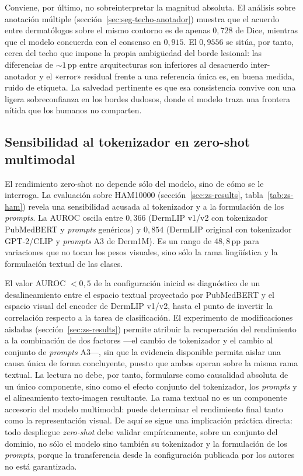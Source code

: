 Conviene, por último, no sobreinterpretar la magnitud absoluta. El
análisis sobre anotación múltiple
(sección~\ref{sec:seg-techo-anotador}) muestra que el acuerdo entre
dermatólogos sobre el mismo contorno es de apenas $0{,}728$ de Dice,
mientras que el modelo concuerda con el consenso en $0{,}915$. El
$0{,}9556$ se sitúa, por tanto, cerca del techo que impone la propia
ambigüedad del borde lesional: las diferencias de $\sim 1$\,pp entre
arquitecturas son inferiores al desacuerdo inter-anotador y el «error»
residual frente a una referencia única es, en buena medida, ruido de
etiqueta. La salvedad pertinente es que esa consistencia convive con
una ligera sobreconfianza en los bordes dudosos, donde el modelo traza
una frontera nítida que los humanos no comparten.

\subsection{Sensibilidad al tokenizador en zero-shot multimodal}
\label{sec:disc-zs}

El rendimiento zero-shot no depende sólo del modelo, sino de cómo se
le interroga. La evaluación sobre HAM10000
(sección~\ref{sec:zs-results}, tabla~\ref{tab:zs-ham}) revela una
sensibilidad acusada al tokenizador y a la formulación de los
\emph{prompts}. La AUROC oscila entre $0{,}366$ (DermLIP v1/v2 con
tokenizador PubMedBERT y \emph{prompts} genéricos) y $0{,}854$
(DermLIP original con tokenizador GPT-2/CLIP y \emph{prompts} A3 de
Derm1M). Es un rango de $48{,}8$\,pp para variaciones que no tocan
los pesos visuales, sino sólo la rama lingüística y la formulación
textual de las clases.

El valor AUROC $<0{,}5$ de la configuración inicial es diagnóstico de un
desalineamiento entre el espacio textual proyectado por PubMedBERT y el
espacio visual del encoder de DermLIP v1/v2, hasta el punto de invertir la
correlación respecto a la tarea de clasificación. El experimento de
modificaciones aisladas (sección~\ref{sec:zs-results}) permite atribuir la
recuperación del rendimiento a la combinación de dos factores ---el cambio
de tokenizador y el cambio al conjunto de \emph{prompts} A3---, sin que la
evidencia disponible permita aislar una causa única de forma concluyente,
puesto que ambos operan sobre la misma rama textual. La lectura no debe,
por tanto, formularse como causalidad absoluta de un único componente,
sino como el efecto conjunto del tokenizador, los \emph{prompts} y el
alineamiento texto-imagen resultante. La rama textual no es un componente
accesorio del modelo multimodal: puede determinar el rendimiento final
tanto como la representación visual. De aquí se sigue una implicación
práctica directa: todo despliegue \emph{zero-shot} debe validar
empíricamente, sobre un conjunto del dominio, no sólo el modelo sino
también su tokenizador y la formulación de los \emph{prompts}, porque la
transferencia desde la configuración publicada por los autores no está
garantizada.

